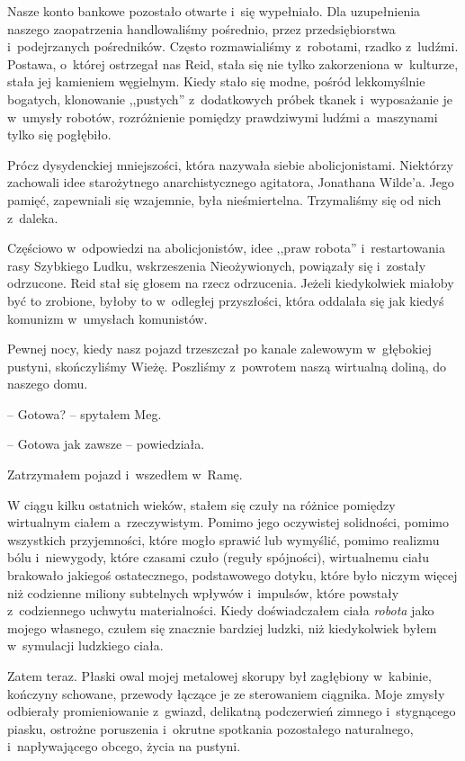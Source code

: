 \documentclass[oneside,polish,11pt,sfheadings]{mwbk}
\begin{document}
Nasze konto bankowe pozostało otwarte i~się wypełniało. Dla uzupełnienia
naszego zaopatrzenia handlowaliśmy pośrednio, przez przedsiębiorstwa i~podejrzanych pośredników. Często rozmawialiśmy z~robotami, rzadko z~ludźmi. Postawa, o~której ostrzegał nas Reid, stała się nie tylko
zakorzeniona w~kulturze, stała jej kamieniem węgielnym. Kiedy stało się
modne, pośród lekkomyślnie bogatych, klonowanie ,,pustych'' z~dodatkowych próbek tkanek i~wyposażanie je w~umysły robotów,
rozróżnienie pomiędzy prawdziwymi ludźmi a~maszynami tylko się
pogłębiło.

Prócz dysydenckiej mniejszości, która nazywała siebie abolicjonistami.
Niektórzy zachowali idee starożytnego anarchistycznego agitatora,
Jonathana Wilde'a. Jego pamięć, zapewniali się wzajemnie, była
nieśmiertelna. Trzymaliśmy się od nich z~daleka.

Częściowo w~odpowiedzi na abolicjonistów, idee ,,praw robota'' i~restartowania rasy Szybkiego Ludku, wskrzeszenia Nieożywionych,
powiązały się i~zostały odrzucone. Reid stał się głosem na rzecz
odrzucenia. Jeżeli kiedykolwiek miałoby być to zrobione, byłoby to w~odległej przyszłości, która oddalała się jak kiedyś komunizm w~umysłach
komunistów.

Pewnej nocy, kiedy nasz pojazd trzeszczał po kanale zalewowym w~głębokiej pustyni, skończyliśmy Wieżę. Poszliśmy z~powrotem naszą
wirtualną doliną, do naszego domu.

-- Gotowa? -- spytałem Meg.

-- Gotowa jak zawsze -- powiedziała.

Zatrzymałem pojazd i~wszedłem w~Ramę.

W ciągu kilku ostatnich wieków, stałem się czuły na różnice pomiędzy
wirtualnym ciałem a~rzeczywistym. Pomimo jego oczywistej solidności,
pomimo wszystkich przyjemności, które mogło sprawić lub wymyślić, pomimo
realizmu bólu i~niewygody, które czasami czuło (reguły spójności),
wirtualnemu ciału brakowało jakiegoś ostatecznego, podstawowego dotyku,
które było niczym więcej niż codzienne miliony subtelnych wpływów i~impulsów, które powstały z~codziennego uchwytu materialności. Kiedy
doświadczałem ciała \emph{robota} jako mojego własnego, czułem się
znacznie bardziej ludzki, niż kiedykolwiek byłem w~symulacji ludzkiego
ciała.

Zatem teraz. Płaski owal mojej metalowej skorupy był zagłębiony w~kabinie, kończyny schowane, przewody łączące je ze sterowaniem ciągnika.
Moje zmysły odbierały promieniowanie z~gwiazd, delikatną podczerwień
zimnego i~stygnącego piasku, ostrożne poruszenia i~okrutne spotkania
pozostałego naturalnego, i~napływającego obcego, życia na pustyni.
\end{document}
